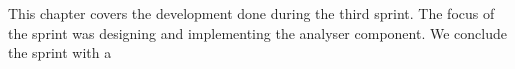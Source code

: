 This chapter covers the development done during the third sprint. The focus of the sprint was designing and implementing the analyser component. We conclude the sprint with a 